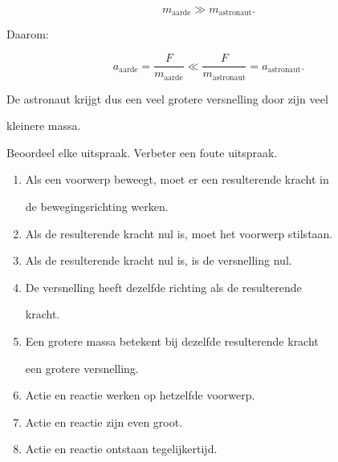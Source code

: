 \documentclass{ximera}
\begin{document}
\begin{oefening}{\oefU\ESS}
\begin{oplossing}
\begin{enumerate}
  \[m_{\mathrm{aarde}}\gg m_{\mathrm{astronaut}}.\]

  Daarom:

  \[a_{\mathrm{aarde}} = \frac{F}{m_{\mathrm{aarde}}} \ll \frac{F}{m_{\mathrm{astronaut}}} = a_{\mathrm{astronaut}}.\]

  De astronaut krijgt dus een veel grotere versnelling door zijn veel

  kleinere massa.

\end{enumerate}

\end{oplossing}

\end{oefening}


\begin{oefening}{\oefB\ESS}

Beoordeel elke uitspraak. Verbeter een foute uitspraak.

\begin{enumerate}

 \item Als een voorwerp beweegt, moet er een resulterende kracht in

    de bewegingsrichting werken.

 \item Als de resulterende kracht nul is, moet het voorwerp stilstaan.

 \item Als de resulterende kracht nul is, is de versnelling nul.

 \item De versnelling heeft dezelfde richting als de resulterende

    kracht.

 \item Een grotere massa betekent bij dezelfde resulterende kracht

    een grotere versnelling.

 \item Actie en reactie werken op hetzelfde voorwerp.

 \item Actie en reactie zijn even groot.

 \item Actie en reactie ontstaan tegelijkertijd.

\end{enumerate}


\begin{oplossing}


\end{oplossing}
\end{oefening}
\end{document}
